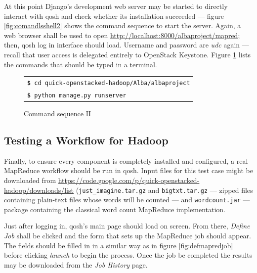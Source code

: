 At this point Django's development web server may be started to directly interact with qosh and check whether its installation succeeded --- figure \ref{fig:comandlsshell2} shows the command sequence to start the server. Again, a web browser shall be used to open \url{http://localhost:8000/albaproject/mapred}; then, qosh log in interface should load. Username and password are \emph{udc} again --- recall that user access is delegated entirely to OpenStack Keystone. Figure \ref{fig:comandosshell2} lists the commands that should be typed in a terminal.

\begin{figure}[tbp]
    \begin{center}
        \begin{tabular}{|l|}
            \hline
            \texttt{{\bf \$} cd quick-openstacked-hadoop/Alba/albaproject} \\
            \texttt{{\bf \$} python manage.py runserver} \\
            \hline
        \end{tabular}
        \caption{Command sequence II}
        \label{fig:comandosshell2}
    \end{center}
\end{figure}

\subsection{Testing a Workflow for Hadoop}\label{subsec:flujohadoop}
\noindent Finally, to ensure every component is completely installed and configured, a real MapReduce workflow should be run in qosh. Input files for this test case might be downloaded from \url{https://code.google.com/p/quick-openstacked-hadoop/downloads/list} (\texttt{just\_imagine.tar.gz} and \texttt{bigtxt.tar.gz} --- zipped files containing plain-text files whose words will be counted --- and \texttt{wordcount.jar} --- package containing the classical word count MapReduce implementation.

Just after logging in, qosh's main page should load on screen. From there, \emph{Define Job} shall be clicked and the form that sets up the MapReduce job should appear. The fields should be filled in in a similar way as in figure \ref{fig:defmapredjob} before clicking \emph{launch} to begin the process. Once the job be completed the results may be downloaded from the \emph{Job History} page.

